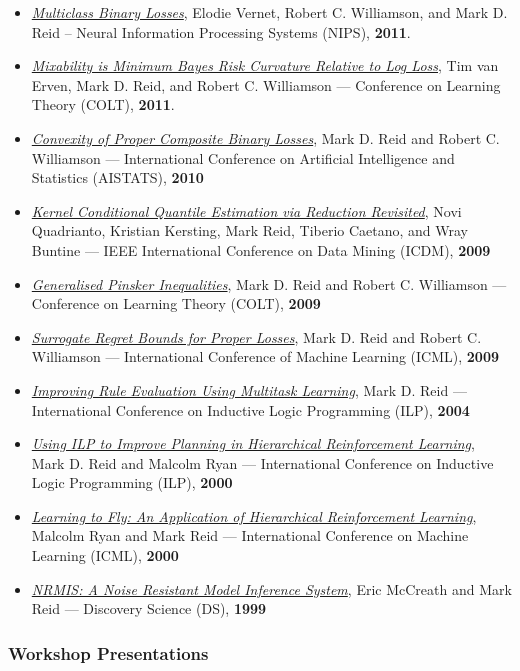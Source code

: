 \documentclass{article}
\begin{document}
\begin{itemize}%
\item \emph{\href{http://books.nips.cc/papers/files/nips24/NIPS2011_0719.pdf}{Multiclass Binary Losses}}, Elodie Vernet, Robert C. Williamson, and Mark D. Reid – Neural Information Processing Systems (NIPS), \textbf{2011}.
\item \emph{\href{http://mark.reid.name/files/pubs/colt11.pdf}{Mixability is Minimum Bayes Risk Curvature Relative to Log Loss}}, Tim van Erven, Mark D. Reid, and Robert C. Williamson — Conference on Learning Theory (COLT), \textbf{2011}.
\item \emph{\href{http://jmlr.csail.mit.edu/proceedings/papers/v9/reid10a/reid10a.pdf}{Convexity of Proper Composite Binary Losses}}, Mark D. Reid and Robert C. Williamson — International Conference on Artificial Intelligence and Statistics (AISTATS), \textbf{2010}
\item \emph{\href{http://mark.reid.name/files/pubs/icdm09.pdf}{Kernel Conditional Quantile Estimation via Reduction Revisited}}, Novi Quadrianto, Kristian Kersting, Mark Reid, Tiberio Caetano, and Wray Buntine — IEEE International Conference on Data Mining (ICDM), \textbf{2009}
\item \emph{\href{http://mark.reid.name/files/pubs/colt09.pdf}{Generalised Pinsker Inequalities}}, Mark D. Reid and Robert C. Williamson — Conference on Learning Theory (COLT), \textbf{2009}
\item \emph{\href{http://mark.reid.name/files/pubs/icml09.pdf}{Surrogate Regret Bounds for Proper Losses}}, Mark D. Reid and Robert C. Williamson — International Conference of Machine Learning (ICML), \textbf{2009}
\item \emph{\href{http://mark.reid.name/files/pubs/ilp04.pdf}{Improving Rule Evaluation Using Multitask Learning}}, Mark D. Reid — International Conference on Inductive Logic Programming (ILP), \textbf{2004}
\item \emph{\href{http://mark.reid.dev/files/pubs/ilp00.pdf}{Using ILP to Improve Planning in Hierarchical Reinforcement Learning}}, Mark D. Reid and Malcolm Ryan — International Conference on Inductive Logic Programming (ILP), \textbf{2000}
\item \emph{\href{http://mark.reid.dev/files/pubs/icml00.pdf}{Learning to Fly: An Application of Hierarchical Reinforcement Learning}}, Malcolm Ryan and Mark Reid — International Conference on Machine Learning (ICML), \textbf{2000}
\item \emph{\href{http://mark.reid.dev/files/pubs/ds99.pdf}{NRMIS: A Noise Resistant Model Inference System}}, Eric McCreath and Mark Reid — Discovery Science (DS), \textbf{1999}

\end{itemize}
\hypertarget{workshop_presentations}{}\subsubsection*{{Workshop Presentations}}\label{workshop_presentations}
\end{document}
